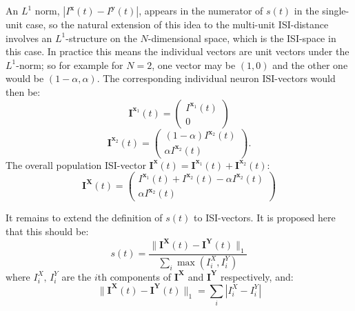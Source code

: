 An $L^1$ norm, $| I^{\mathbf{x}}(t) - I^{\mathbf{y}}(t) | $, appears in the numerator of $s(t)$ in the single-unit case, so the natural extension of this idea to the multi-unit ISI-distance involves an $L^1$-structure on the $N$-dimensional space, which is the ISI-space in this case. In practice this means the individual vectors are unit vectors under the $L^1$-norm; so for example for $N=2$, one vector may be $(1,0)$ and the other one would be $(1-\alpha,\alpha)$.  The corresponding individual neuron ISI-vectors would then be: 
\begin{equation}
\mathbf{I}^{\mathbf{x}_1}(t)=\begin{pmatrix}I^{\mathbf{x}_1}(t)\\0\end{pmatrix}
\end{equation}
\begin{equation}
\mathbf{I}^{\mathbf{x}_2}(t) = \begin{pmatrix} (1-\alpha)I^{\mathbf{x}_2}(t)\\ \alpha I^{\mathbf{x}_2}(t)\end{pmatrix}.
\end{equation}
The overall population ISI-vector $\mathbf{I^x}(t) = \mathbf{I}^{\mathbf{x}_1}(t) + \mathbf{I}^{\mathbf{x}_2}(t)$:
\begin{equation}
\mathbf{I^X}(t) = \begin{pmatrix} I^{\mathbf{x}_1}(t) + I^{\mathbf{x}_2}(t) - \alpha I^{\mathbf{x}_2}(t) \\ \alpha I^{\mathbf{x}_2}(t) \end{pmatrix}
\end{equation}

It remains to extend the definition of $s(t)$ to ISI-vectors. It is proposed here that this should be:
\begin{equation}
s(t) = \frac{ \| \mathbf{I^X}(t) - \mathbf{I^Y}(t) \|_1 }{ \sum_i \max ( I^X_i, I^Y_i ) }
\end{equation}
where $I^X_i, \, I^Y_i$ are the $i$th components of $\mathbf{I^X}$ and $\mathbf{I^Y}$ respectively, and:
\begin{equation}
\| \mathbf{I^X}(t) - \mathbf{I^Y}(t) \|_1 = \sum_i | I^X_i - I^Y_i |
\end{equation}

